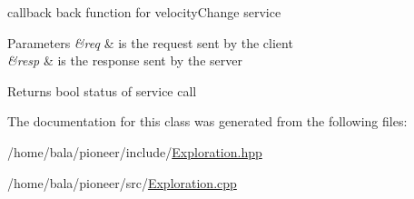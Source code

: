 callback back function for velocity\+Change service 


\begin{DoxyParams}{Parameters}
{\em \&req} & is the request sent by the client \\
\hline
{\em \&resp} & is the response sent by the server \\
\hline
\end{DoxyParams}
\begin{DoxyReturn}{Returns}
bool status of service call 
\end{DoxyReturn}


The documentation for this class was generated from the following files\+:\begin{DoxyCompactItemize}
\item 
/home/bala/pioneer/include/\hyperlink{_exploration_8hpp}{Exploration.\+hpp}\item 
/home/bala/pioneer/src/\hyperlink{_exploration_8cpp}{Exploration.\+cpp}\end{DoxyCompactItemize}
